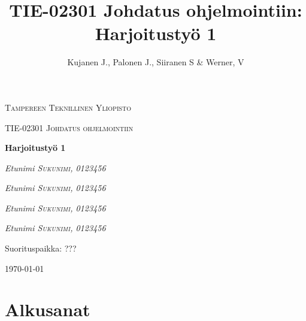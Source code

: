 \documentclass[12pt]{report} %
\title{TIE-02301 Johdatus ohjelmointiin: Harjoitustyö 1}
\author{Kujanen J., Palonen J., Siiranen S \& Werner, V}
\begin{document}

    \begin{titlepage}
        \centering
        {\scshape\LARGE Tampereen Teknillinen Yliopisto \par}
        \vspace{1cm}
        {\scshape\Large TIE-02301 Johdatus ohjelmointiin\par}
        \vspace{2.5cm}
        {\huge\bfseries Harjoitustyö 1 \par}
        \vspace{4cm}
        {\Large\itshape Etunimi \textsc{Sukunimi}, \textit{0123456}\par}
        {\Large\itshape Etunimi \textsc{Sukunimi}, \textit{0123456}\par}
        {\Large\itshape Etunimi \textsc{Sukunimi}, \textit{0123456}\par}
        {\Large\itshape Etunimi \textsc{Sukunimi}, \textit{0123456}\par}
        
        \vfill
        Suorituspaikka: \textsc{???}
    
        \vfill
    
        {\large \today \par}
    \end{titlepage}

    
    \setcounter{page}{1}                    %
    

    {
        \hypersetup{linkcolor=black}
        \tableofcontents  %
    
    }
    

    
    \chapter*{Alkusanat}
    
\end{document}
